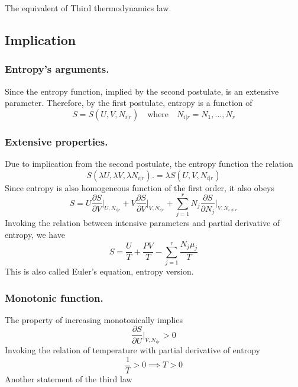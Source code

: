 \documentclass[../../../Main.tex]{subfiles}
\begin{document}
The equivalent of Third thermodynamics law.

\subsection*{Implication}
\subsubsection*{Entropy's arguments.} Since the entropy function, implied by the second postulate, is an extensive parameter. Therefore, by the first postulate, entropy is a function of 
\begin{equation*}
    S=S(U,V,N_{i|r})\quad\text{where}\quad N_{i|r}=N_1,\dots,N_r
\end{equation*}

\subsubsection*{Extensive properties.} Due to implication from the second postulate, the entropy function the relation 
\begin{equation*}
    S(\lambda U, \lambda V, \lambda N_{i|r} ). = \lambda S(U, V, N_{i|r} )
\end{equation*}
Since entropy is also homogeneous function of the first order, it also obeys 
\begin{equation*}
    S=U\frac{\partial S}{\partial V}\bigg|_{U,N_{i|r}}+V\frac{\partial S}{\partial V}\bigg|_{V,N_{i|r}}+ \sum_{j=1}^{r} N_j\frac{\partial S}{\partial N_j}\bigg|_{V,N_{i\neq r}}
\end{equation*}
Invoking the relation between intensive parameters and partial derivative of entropy, we have 
\begin{equation*}
    S=\frac{U}{T}+\frac{PV}{T}-\sum_{j=1}^{r}\frac{N_j\mu_j}{T}
\end{equation*}
This is also called Euler's equation, entropy version.

\subsubsection*{Monotonic function.} The property of increasing monotonically implies
\begin{equation*}
    \frac{\partial S}{\partial U}\bigg|_{V,N_{i|r}}>0
\end{equation*}
Invoking the relation of temperature with partial derivative of entropy
\begin{equation*}
    \frac{1}{T}>0\implies T>0
\end{equation*}
Another statement of the third law
\end{document}
